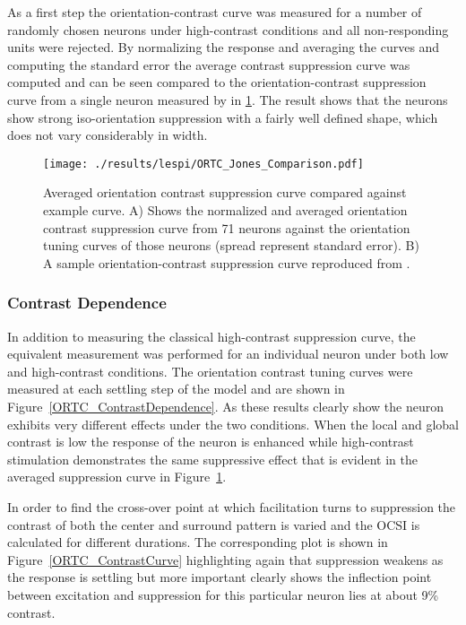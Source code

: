 As a first step the orientation-contrast curve was measured for a
number of randomly chosen neurons under high-contrast conditions and
all non-responding units were rejected. By normalizing the response
and averaging the curves and computing the standard error the average
contrast suppression curve was computed and can be seen compared to
the orientation-contrast suppression curve from a single neuron
measured by \cite{Jones2002} in \ref{ORTC_Jones}. The result shows
that the neurons show strong iso-orientation suppression with a fairly
well defined shape, which does not vary considerably in width.

\begin{figure}
	\centering
        \texttt{[image: ./results/lespi/ORTC\_Jones\_Comparison.pdf]}
	\caption[Averaged orientation-contrast suppression curve compared
      against \cite{Jones2002} example curve.]{Averaged orientation
      contrast suppression curve compared against \cite{Jones2002}
      example curve. A) Shows the normalized and averaged orientation
      contrast suppression curve from 71 neurons against the
      orientation tuning curves of those neurons (spread represent
      standard error). B) A sample orientation-contrast suppression
      curve reproduced from \cite{Jones2002}.}
	\label{ORTC_Jones}
\end{figure}

\subsubsection{Contrast Dependence}

In addition to measuring the classical high-contrast suppression
curve, the equivalent measurement was performed for an individual
neuron under both low and high-contrast conditions. The orientation
contrast tuning curves were measured at each settling step of the
model and are shown in Figure~\ref{ORTC_ContrastDependence}. As these
results clearly show the neuron exhibits very different effects under
the two conditions. When the local and global contrast is low the
response of the neuron is enhanced while high-contrast stimulation
demonstrates the same suppressive effect that is evident in the
averaged suppression curve in Figure~\ref{ORTC_Jones}.

In order to find the cross-over point at which facilitation turns to
suppression the contrast of both the center and surround pattern is
varied and the OCSI is calculated for different durations. The
corresponding plot is shown in Figure~\ref{ORTC_ContrastCurve}
highlighting again that suppression weakens as the response is
settling but more important clearly shows the inflection point between
excitation and suppression for this particular neuron lies at about
9\% contrast.

